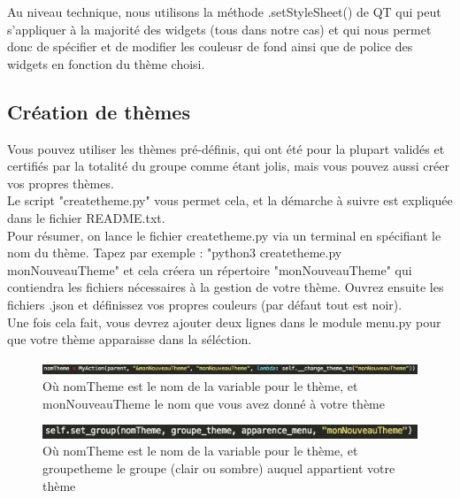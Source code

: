 \documentclass[a4paper,12pt]{article}
\begin{document}
			Au niveau technique, nous utilisons la méthode .setStyleSheet() de QT qui peut s'appliquer à la majorité des widgets (tous dans notre cas) et qui nous permet donc de spécifier et de modifier les couleusr de fond ainsi que de police des widgets en fonction du thème choisi.
			
		\subsection{Création de thèmes}
		
			Vous pouvez utiliser les thèmes pré-définis, qui ont été pour la plupart validés et certifiés par la totalité du groupe comme étant jolis, mais vous pouvez aussi créer vos propres thèmes.\\
			
			Le script "createtheme.py" vous permet cela, et la démarche à suivre est expliquée dans le fichier README.txt.\\
			
			Pour résumer, on lance le fichier createtheme.py via un terminal en spécifiant le nom du thème. Tapez par exemple :
			"python3 createtheme.py monNouveauTheme" et cela créera un répertoire "monNouveauTheme" qui contiendra les fichiers nécessaires à la gestion de votre thème. Ouvrez ensuite les fichiers .json et définissez vos propres couleurs (par défaut tout est noir).\\
			
			Une fois cela fait, vous devrez ajouter deux lignes dans le module menu.py pour que votre thème apparaisse dans la séléction.
			
			\newpage

			\begin{figure}[h!]
				\begin{center}
					\includegraphics[scale=0.5]{images/imgs_themes/add2}
					\caption{Où nomTheme est le nom de la variable pour le thème, et monNouveauTheme le nom que vous avez donné à votre thème}
				\end{center}
			\end{figure}
			\begin{figure}[h!]
				\begin{center}
					\includegraphics[scale=0.7]{images/imgs_themes/add1}
					\caption{Où nomTheme est le nom de la variable pour le thème, et groupetheme le groupe (clair ou sombre) auquel appartient votre thème}
				\end{center}
			\end{figure}
			
\end{document}

